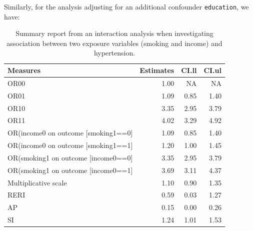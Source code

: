 \documentclass[
  letterpaper,
  DIV=11,
  numbers=noendperiod]{scrreprt}
\begin{document}
Similarly, for the analysis adjusting for an additional confounder
\texttt{education}, we have:

\hypertarget{tbl-effint-fit.w.int}{}
\begin{table}[!h]
\caption{\label{tbl-effint-fit.w.int}Summary report from an interaction analysis when investigating
association between two exposure variables (smoking and income) and
hypertension. }\tabularnewline

\centering
\begin{tabular}{lrrr}
\toprule
Measures & Estimates & CI.ll & CI.ul\\
\midrule
OR00 & 1.00 & NA & NA\\
OR01 & 1.09 & 0.85 & 1.40\\
OR10 & 3.35 & 2.95 & 3.79\\
OR11 & 4.02 & 3.29 & 4.92\\
OR(income0 on outcome [smoking1==0] & 1.09 & 0.85 & 1.40\\
\addlinespace
OR(income0 on outcome [smoking1==1] & 1.20 & 1.00 & 1.45\\
OR(smoking1 on outcome [income0==0] & 3.35 & 2.95 & 3.79\\
OR(smoking1 on outcome [income0==1] & 3.69 & 3.11 & 4.37\\
Multiplicative scale & 1.10 & 0.90 & 1.35\\
RERI & 0.59 & 0.03 & 1.27\\
\addlinespace
AP & 0.15 & 0.00 & 0.26\\
SI & 1.24 & 1.01 & 1.53\\
\bottomrule
\end{tabular}
\end{table}
\end{document}
